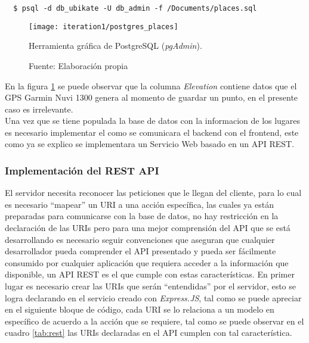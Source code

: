 \begin{verbatim}
  $ psql -d db_ubikate -U db_admin -f /Documents/places.sql
\end{verbatim}

\begin{figure}[H]
  \begin{center}
    \texttt{[image: iteration1/postgres\_places]}
    \caption{Herramienta gráfica de PostgreSQL (\emph{pgAdmin}).}
    \label{fig:postgres_places}
    \caption*{Fuente: Elaboración propia}
  \end{center}
\end{figure}

En la figura \ref{fig:postgres_places} se puede observar que la columna \emph{Elevation} contiene datos que el GPS Garmin Nuvi 1300 genera al momento de guardar un punto, en el presente caso es irrelevante.\\


Una vez que se tiene populada la base de datos con la informacion de los lugares es necesario implementar el como se comunicara el backend con el frontend, este como ya se explico se implementara un Servicio Web basado en un API REST.\\



\subsubsection{Implementación del REST API}
\label{subs:Implementacion del REST API}



El servidor necesita reconocer las peticiones que le llegan del cliente, para lo cual es necesario ``mapear'' un URI a una acción específica, las cuales ya están preparadas para comunicarse con la base de datos, no hay restricción en la declaración de las URIs pero para una mejor comprensión del API que se está desarrollando es necesario seguir convenciones que aseguran que cualquier desarrollador pueda comprender el API presentado y pueda ser fácilmente consumido por cualquier aplicación que requiera acceder a la información que disponible, un API REST es el que cumple con estas características.
En primer lugar es necesario crear las URIs que serán ``entendidas'' por el servidor, esto se logra declarando en el servicio creado con \emph{Express.JS}, tal como se puede apreciar en el siguiente bloque de código, cada URI se lo relaciona a un modelo en específico de acuerdo a la acción que se requiere, tal como se puede observar en el cuadro \ref{tab:rest} las URIs declaradas en el API cumplen con tal característica.\\


